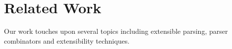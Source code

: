 \vspace{-3pt}
\section{Related Work}\label{sec:relatedwork}

%
%
%
%

Our work touches upon several topics including extensible parsing,
parser combinators and extensibility techniques. 

\begin{comment}
There has been a
great amount of related papers on those topics. Some
inspired us of this paper and encourage us for more exploration. This
section will try to lead a discussion on what difference we have made.
\end{comment}

\vspace{-4pt}
